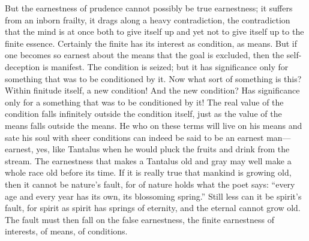 \documentclass[12pt]{book}
\begin{document}
But the earnestness of prudence cannot possibly be true earnestness; it
suffers from an inborn frailty, it drags along a heavy contradiction,
the contradiction that the mind is at once both to give itself up and
yet not to give itself up to the finite essence. Certainly the finite
has its interest as condition, as means. But if one becomes so earnest
about the means that the goal is excluded, then the self-deception is
manifest. The condition is seized; but it has significance only for
something that was to be conditioned by it. Now what sort of something
is this? Within finitude itself, a new condition! And the new condition?
Has significance only for a something that was to be conditioned by it!
The real value of the condition falls infinitely outside the condition
itself, just as the value of the means falls outside the means. He who
on these terms will live on his means and sate his soul with sheer
conditions can indeed be said to be an earnest man---earnest, yes, like
Tantalus when he would pluck the fruits and drink from the stream. The
earnestness that makes a Tantalus old and gray may well make a whole
race old before its time. If it is really true that mankind is growing
old, then it cannot be nature's fault, for of nature holds what the
poet says: ``every age and every year has its own, its blossoming
spring.'' Still less can it be spirit's fault, for spirit as spirit has
springs of eternity, and the eternal cannot grow old. The fault must
then fall on the false earnestness, the finite earnestness of interests,
of means, of conditions.
\end{document}
